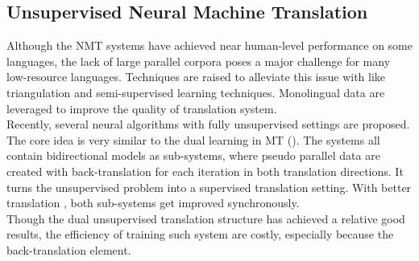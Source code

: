 \subsection{Unsupervised Neural Machine Translation}
 Although the NMT systems have achieved near human-level performance on some languages, the lack of large parallel corpora poses a major challenge for many low-resource languages.
 Techniques are raised to alleviate this issue with like triangulation and semi-supervised learning techniques.  Monolingual data are leveraged to improve the quality of translation system. \\
 Recently, several neural algorithms with fully unsupervised settings are proposed. The core idea is very similar to the dual learning in MT (\cite{he2016dual}). The systems all contain bidirectional models as sub-systems, where pseudo parallel data are created with back-translation for each iteration in both translation directions. It turns the unsupervised problem into a supervised translation setting. With better translation , both sub-systems get improved synchronously.\\
 Though the dual unsupervised translation structure has achieved a relative good results, the efficiency of training such system are costly, especially because the back-translation element.








